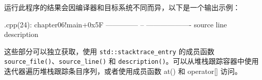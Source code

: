 运行此程序的结果会因编译器和目标系统不同而异，以下是一个输出示例：

\begin{shell}
[...]\main.cpp(24): chapter06!main+0x5F
-------------- --   -------------------
source         line description
\end{shell}

这些部分可以独立获取，使用 \verb|std::stacktrace_entry| 的成员函数 \verb|source_file()|、\verb|source_line()| 和 \verb|description()|。可以从堆栈跟踪容器中使用迭代器遍历堆栈跟踪条目序列，或者使用成员函数 at() 和 operator[] 访问。


